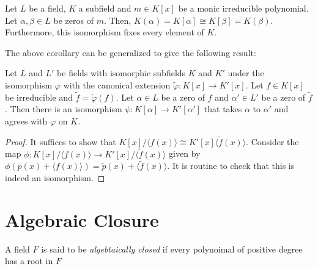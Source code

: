 \begin{corollary}
    Let $L$ be a field, $K$ a subfield and $m\in K[x]$ be a monic irreducible polynomial. Let $\alpha,\beta\in L$ be zeros of $m$. Then, $K(\alpha) = K[\alpha]\cong K[\beta] = K(\beta)$. Furthermore, this isomorphism fixes every element of $K$.
\end{corollary}

The above corollary can be generalized to give the following result: 
\begin{theorem}
    Let $L$ and $L'$ be fields with isomorphic subfields $K$ and $K'$ under the isomorphism $\varphi$ with the canonical extension $\widetilde{\varphi}:K[x]\to K'[x]$. Let $f\in K[x]$ be irreducible and $\widetilde{f} = \widetilde{\varphi}(f)$. Let $\alpha\in L$ be a zero of $f$ and $\alpha'\in L'$ be a zero of $\widetilde{f}$. Then there is an isomorphism $\psi:K[\alpha]\to K'[\alpha']$ that takes $\alpha$ to $\alpha'$ and agrees with $\varphi$ on $K$.
\end{theorem}
\begin{proof}
    It suffices to show that $K[x]/\langle f(x)\rangle\cong K'[x]\langle\widetilde{f}(x)\rangle$. Consider the map $\phi:K[x]/\langle f(x)\rangle\to K'[x]/\langle\widetilde{f}(x)\rangle$ given by $\phi(p(x) + \langle f(x)\rangle) = \widetilde{p}(x) + \langle\widetilde{f}(x)\rangle$. It is routine to check that this is indeed an isomorphism.
\end{proof}

\section{Algebraic Closure}
\begin{definition}
   A field $F$ is said to be \textit{algebtaically closed} if every polynoimal of positive degree has a root in $F$ 
\end{definition}


